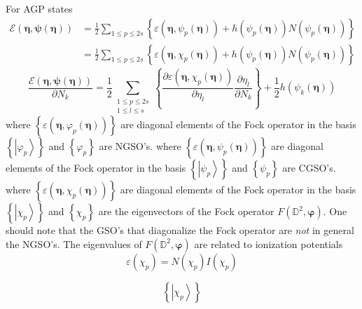 \documentclass[aps,preprint]{revtex4}%
\begin{document}
For AGP states
\begin{align*}
\mathcal{E}\left(  \mathbf{\eta},\mathbf{\psi}\left(  \mathbf{\eta}\right)
\right)   &  =\frac{1}{2}\sum_{1\leq p\leq2s}\left\{  \varepsilon\left(
\mathbf{\eta,}\psi_{p}\left(  \mathbf{\eta}\right)  \right)  +h\left(
\psi_{p}\left(  \mathbf{\eta}\right)  \right)  N\left(  \psi_{p}\left(
\mathbf{\eta}\right)  \right)  \right\} \\
&  =\frac{1}{2}\sum_{1\leq p\leq2s}\left\{  \varepsilon\left(  \mathbf{\eta
,}\chi_{p}\left(  \mathbf{\eta}\right)  \right)  +h\left(  \psi_{p}\left(
\mathbf{\eta}\right)  \right)  N\left(  \psi_{p}\left(  \mathbf{\eta}\right)
\right)  \right\}
\end{align*}%
\[
\frac{\mathcal{E}\left(  \mathbf{\eta},\mathbf{\psi}\left(  \mathbf{\eta
}\right)  \right)  }{\partial N_{k}}=\frac{1}{2}\sum_{\substack{1\leq
p\leq2s\\1\leq l\leq s}}\left\{  \frac{\partial\varepsilon\left(
\mathbf{\eta,}\chi_{p}\left(  \mathbf{\eta}\right)  \right)  }{\partial
\eta_{l}}\frac{\partial\eta_{l}}{\partial N_{k}}\right\}  +\frac{1}{2}h\left(
\psi_{k}\left(  \mathbf{\eta}\right)  \right)
\]
where $\left\{  \varepsilon\left(  \mathbf{\eta,}\varphi_{p}\left(
\mathbf{\eta}\right)  \right)  \right\}  $ are diagonal elements of the Fock
operator in the basis $\left\{  \left\vert \varphi_{p}\right\rangle \right\}
$ and $\left\{  \varphi_{p}\right\}  $ are NGSO's. where $\left\{
\varepsilon\left(  \mathbf{\eta,}\psi_{p}\left(  \mathbf{\eta}\right)
\right)  \right\}  $ are diagonal elements of the Fock operator in the basis
$\left\{  \left\vert \psi_{p}\right\rangle \right\}  $ and $\left\{  \psi
_{p}\right\}  $ are CGSO's. where $\left\{  \varepsilon\left(  \mathbf{\eta
,}\chi_{p}\left(  \mathbf{\eta}\right)  \right)  \right\}  $ are diagonal
elements of the Fock operator in the basis $\left\{  \left\vert \chi
_{p}\right\rangle \right\}  $ and $\left\{  \chi_{p}\right\}  $ are the
eigenvectors of the Fock operator $F\left(  \mathbb{D}^{2},\mathbf{\varphi
}\right)  $. One should note that the GSO's that diagonalize the Fock operator
are \emph{not }in general the NGSO's. The eigenvalues of $F\left(
\mathbb{D}^{2},\mathbf{\varphi}\right)  $ are related to ionization
potentials
\[
\varepsilon\left(  \chi_{p}\right)  =N\left(  \chi_{p}\right)  I\left(
\chi_{p}\right)
\]
%

\[
\left\{  \left\vert \chi_{p}\right\rangle \right\}
\]
\end{document}
